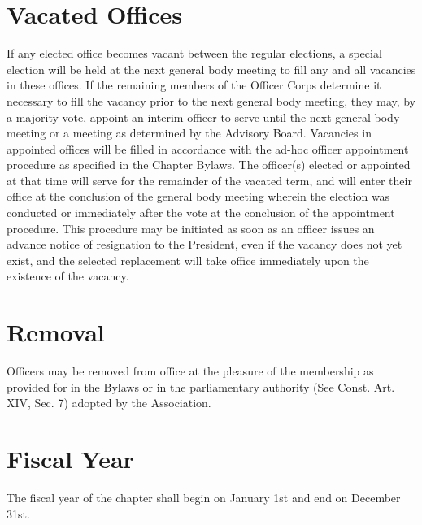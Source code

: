 \section{Vacated Offices} If any elected office becomes vacant between the regular elections, a special election will be held at the next general body meeting to fill any and all vacancies in these offices. If the remaining members of the Officer Corps determine it necessary to fill the vacancy prior to the next general body meeting, they may, by a majority vote, appoint an interim officer to serve until the next general body meeting or a meeting as determined by the Advisory Board. Vacancies in appointed offices will be filled in accordance with the ad-hoc officer appointment procedure as specified in the Chapter Bylaws. The officer(s) elected or appointed at that time will serve for the remainder of the vacated term, and will enter their office at the conclusion of the general body meeting wherein the election was conducted or immediately after the vote at the conclusion of the appointment procedure. This procedure may be initiated as soon as an officer issues an advance notice of resignation to the President, even if the vacancy does not yet exist, and the selected replacement will take office immediately upon the existence of the vacancy. %

\section{Removal} Officers may be removed from office at the pleasure of the membership as provided for in the Bylaws or in the parliamentary authority (See Const. Art. XIV, Sec. 7) adopted by the Association. %

\section{Fiscal Year} The fiscal year of the chapter shall begin on January 1st and end on December 31st.



